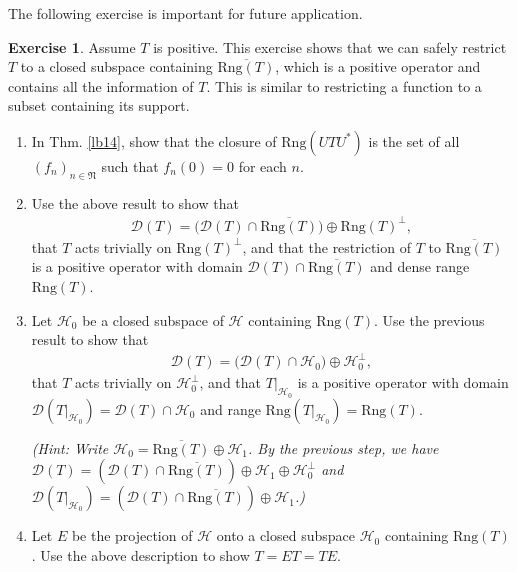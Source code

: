 \documentclass[12pt,b5paper,notitlepage]{article}
\theoremstyle{definition}
\newtheorem{exe}[df]{Exercise}
\theoremstyle{plain}
\newcommand{\fk}{\mathfrak}
\newcommand{\mc}{\mathcal}
\newcommand{\ovl}{\overline}
\newcommand{\Dom}{\scr D}
\newcommand{\scr}{\mathscr}
\newcommand{\Rng}{\mathrm{Rng}}
\numberwithin{equation}{section}
\begin{document}
The following exercise is important for future application.

\begin{exe}\label{lb15}
Assume $T$ is positive. This exercise shows that we can safely restrict $T$ to a closed subspace containing $\ovl{\Rng(T)}$, which is a positive operator and contains all the information of $T$. This is similar to restricting a function to a subset containing its support.
\begin{enumerate}
\item In Thm. \ref{lb14}, show that the closure of $\Rng(UTU^*)$ is the set of all $(f_n)_{n\in\fk N}$ such that $f_n(0)=0$ for each $n$.
\item Use the above result to show that 
\begin{align*}
\Dom(T)=\big(\Dom(T)\cap\ovl{\Rng(T)}\big)\oplus \Rng(T)^\perp,	
\end{align*}
that $T$ acts trivially on $\Rng(T)^\perp$, and that the restriction of  $T$ to $\ovl{\Rng(T)}$ is a positive operator with domain $\Dom(T)\cap\ovl{\Rng(T)}$ and dense range $\Rng(T)$.
\item Let $\mc H_0$ be a closed subspace of $\mc H$ containing $\Rng(T)$. Use the previous result to show that
\begin{align*}
\Dom(T)=\big(\Dom(T)\cap \mc H_0\big)\oplus\mc H_0^\perp,	
\end{align*}
that $T$ acts trivially on $\mc H_0^\perp$, and that $T|_{\mc H_0}$ is a positive operator with domain $\Dom(T|_{\mc H_0})=\Dom(T)\cap \mc H_0$ and range $\Rng(T|_{\mc H_0})=\Rng(T)$.

\textit{(Hint: Write $\mc H_0=\ovl{\Rng(T)}\oplus\mc H_1$. By the previous step, we have  $\Dom(T)=(\Dom(T)\cap\ovl{\Rng(T)})\oplus\mc H_1\oplus\mc H_0^\perp$ and $\Dom(T|_{\mc H_0})=(\Dom(T)\cap\ovl{\Rng(T)})\oplus\mc H_1$.)}
\item  Let $E$ be the projection of $\mc H$ onto a closed subspace $\mc H_0$ containing $\Rng(T)$. Use the above description to show $T=ET=TE$.
\end{enumerate}

\end{exe}
\end{document}
